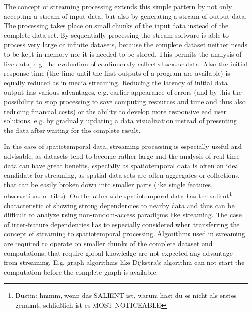 	The concept of streaming processing extends this simple pattern by not only accepting a stream of input data, but also by generating a stream of output data. The processing takes place on small chunks of the input data instead of the complete data set. By sequentially processing the stream software is able to process very large or infinite datasets, because the complete dataset neither needs to be kept in memory nor it is needed to be stored. This permits the analysis of live data, e.g. the evaluation of continuously collected sensor data. Also the initial response time (the time until the first outputs of a program are available) is equally reduced as in media streaming. Reducing the latency of initial data output has various advantages, e.g. earlier appearance of errors (and by this the possibility to stop processing to save computing resources and time and thus also reducing financial costs) or the ability to develop more responsive end user solutions, e.g. by gradually updating a data visualization instead of presenting the data after waiting for the complete result.

	In the case of spatiotemporal data, streaming processing is especially useful and advisable, as datasets tend to become rather large and the analysis of real-time data can have great benefits, especially as spatiotemporal data is often an ideal candidate for streaming, as spatial data sets are often aggregates or collections, that can be easily broken down into smaller parts (like single features, observations or tiles). On the other side spatiotemporal data has the salient\footnote{Dustin: hmmm, wenn das SALIENT ist, warum hast du es nicht als erstes genannt, schließlich ist es MOST NOTICEABLE} characteristic of showing strong dependencies to nearby data and thus can be difficult to analyze using non-random-access paradigms like streaming. The case of inter-feature dependencies has to especially considered when transferring the concept of streaming to spatiotemporal processing. Algorithms used in streaming are required to operate on smaller chunks of the complete dataset and computations, that require global knowledge are not expected any advantage from streaming. E.g. graph algorithms like Dijkstra's algorithm \citep{dijkstra} can not start the computation before the complete graph is available.

